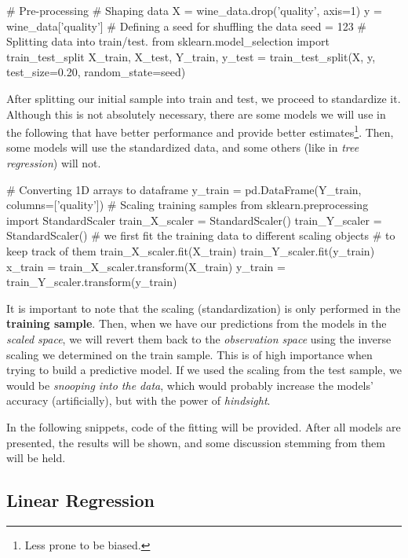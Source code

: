 \documentclass[11pt]{article}
\begin{document}
\begin{pyconsole}[][]
# Pre-processing
# Shaping data
X = wine_data.drop('quality', axis=1)
y = wine_data['quality']
# Defining a seed for shuffling the data
seed = 123
# Splitting data into train/test.
from sklearn.model_selection import train_test_split
X_train, X_test, Y_train, y_test = train_test_split(X, y, test_size=0.20,
                                                    random_state=seed)
\end{pyconsole}

After splitting our initial sample into train and test, we proceed to standardize it.
Although this is not absolutely necessary, there are some models we will use in the following that
have better performance and provide better estimates\footnote{Less prone to be biased.}.
Then, some models will use the standardized data, and some others (like in \emph{tree regression})
will not.

\begin{pyconsole}[][]
# Converting 1D arrays to dataframe
y_train = pd.DataFrame(Y_train, columns=['quality'])
# Scaling training samples
from sklearn.preprocessing import StandardScaler
train_X_scaler = StandardScaler()
train_Y_scaler = StandardScaler()
# we first fit the training data to different scaling objects
# to keep track of them
train_X_scaler.fit(X_train)
train_Y_scaler.fit(y_train)
x_train = train_X_scaler.transform(X_train)
y_train = train_Y_scaler.transform(y_train)
\end{pyconsole}

It is important to note that the scaling (standardization) is only performed in the \textbf{training sample}.
Then, when we have our predictions from the models in the \emph{scaled space}, we will revert them back
to the \emph{observation space} using the inverse scaling we determined on the train sample.
This is of high importance when trying to build a predictive model.
If we used the scaling from the test sample, we would be \emph{snooping into the data}, which would probably
increase the models' accuracy (artificially), but with the power of \emph{hindsight}.

In the following snippets, code of the fitting will be provided.
After all models are presented, the results will be shown, and some discussion stemming from them will be
held.

\subsection{Linear Regression}\label{subsec:linear-regression}
\end{document}
